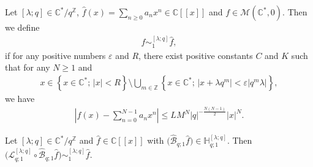 Let $[\lambda;q]\in\mathbb{C}^*/q^\mathbb{Z}$, $\hat{f}(x)=\sum\limits_{n\ge0}a_nx^n\in\mathbb{C}[[x]]$ and $f\in\mathcal{M}(\mathbb{C}^*,0)$. Then we define
\begin{gather*}
f\sim_1^{[\lambda;q]}\hat{f},
\end{gather*}
if for any positive numbers $\varepsilon$ and $R$, there exist positive constants $C$ and $K$ such that for any $N\ge1$ and
\begin{gather*}
x\in\left\{x\in\mathbb{C}^* ;\,|x|<R\right\}\setminus\bigcup_{m\in\mathbb{Z}}\left\{x\in\mathbb{C}^* ;\,|x+\lambda q^m|<\varepsilon |q^m\lambda |\right\},
\end{gather*}
we have
\begin{gather*}
\left|f(x)-\sum_{n=0}^{N-1}a_nx^n\right|\le LM^N|q|^{-\frac{N(N-1)}{2}}|x|^N.
\end{gather*}
\begin{Proposition}\label{qBorel_AE}
Let $[\lambda;q]\in\mathbb{C}^*/q^\mathbb{Z}$ and $\hat{f}\in\mathbb{C}[[x]]$ with $\big(\hat{\mathcal{B}}_{q;1}\hat{f}\big)\in\mathbb{H}_{q;1}^{[\lambda;q]}$. Then $\big(\mathcal{L}_{q;1}^{[\lambda;q]}\circ\hat{\mathcal{B}}_{q;1}\hat{f}\big)\sim_{1}^{[\lambda;q]}\hat{f}$.
\end{Proposition}

